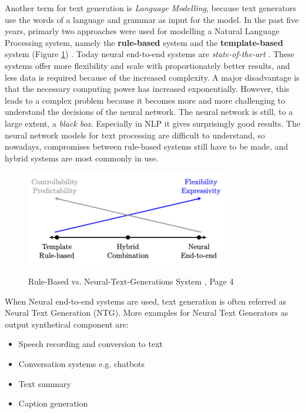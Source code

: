 Another term for text generation is  \textit{Language Modelling}, because text generators use the words of a language and grammar as input for the model. In the past five years, primarly two approaches were used for modelling a Natural Language Processing system, namely the \textbf{rule-based} system and the \textbf{template-based} system (Figure \ref{rules_based}) \cite{NTG2}. Today neural end-to-end systems are \textit{state-of-the-art} \cite{End_to_End}. These systems offer more flexibility and scale with proportionately better results, and less data is required because of the increased complexity. A major disadvantage is that the necessary computing power has increased exponentially. However, this leads to a complex problem because it becomes more and more challenging to understand the decisions of the neural network. The neural network is still, to a large extent, a \textit{black box}. Especially in NLP it gives surprisingly good results. The neural network models for text processing are difficult to understand, so nowadays, compromises between rule-based systems still have to be made, and hybrid systems are most commonly in use. 


\begin{figure}
  \begin{center}
  \includegraphics[width=3.5in]{photos/rule_based}\\
  \caption{Rule-Based vs. Neural-Text-Generations System \cite{NTG2}, Page 4}\label{rules_based}
  \end{center}
\end{figure}

When Neural end-to-end systems are used, text generation is often referred as Neural Text Generation (NTG). More examples for Neural Text Generators as output synthetical component are:

\begin{itemize}
\item Speech recording and conversion to text
\item Conversation systems e.g. chatbots
\item Text summary
\item Caption generation
\end{itemize} 


